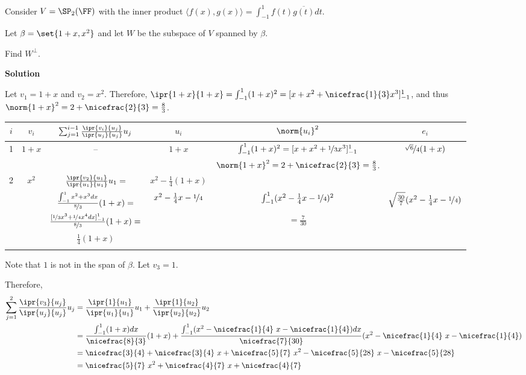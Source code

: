 \documentclass[11pt]{scrartcl}
\author{Alexander Illarionov}
\date{\today}
\title{}
\begin{document}
Consider \(V = \SP_2(\FF)\) with the inner product \(\langle f(x),g(x)\rangle = \int_{-1}^1 f(t)\overline{g(t)} dt\).

Let \(\beta = \set{1+x, x^2}\) and let \(W\) be the subspace of \(V\) spanned by \(\beta\).

\begin{problem*}
Find $W^{\bot}$.
\end{problem*}

\textbf{Solution}

Let \(v_1  = 1 + x\) and \(v_2 = x^2\). 
Therefore, \(\ipr{1+x}{1+x} = \int_{-1}^1 (1+x)^2 = [x+x^2+\nicefrac{1}{3}x^3]_{-1}^1\), 
and thus \(\norm{1+x}^2 = 2 + \nicefrac{2}{3} = \frac{8}{3}\).

\begin{adjustbox}{center}
\begin{tabulary}{1.25\textwidth}{|C|C|C|C|C|C|}
\hline
\(i\) & \(v_i\) & \(\sum_{j=1}^{i-1} \frac{ \ipr{v_i}{u_j}}{\ipr{u_j}{u_j}}u_j\) & \(u_i\) & \(\norm{u_i}^2\) & \(e_i\)\\
 & \(1 + x\) & -- & \(1+x\) & \(\int_{-1}^1(1+x)^2 = [x+x^2+\nicefrac{1}{3}x^3]_{-1}^1\) & \(\nicefrac{\sqrt{6}}{4}(1+x)\)\\
 &  &  &  & \(\norm{1+x}^2 = 2 + \nicefrac{2}{3} = \frac{8}{3}\). & \\
 & \(x^2\) & \(\frac{\ipr{v_2}{u_1}}{\ipr{u_1}{u_1}}u_1=\) & \(x^2-\frac{1}{4}(1+x)\) &  & \\
 &  & \(\frac{\int_{-1}^1 x^2 + x^3 dx}{\nicefrac{8}{3}}(1+x) =\) & \(x^2-\frac{1}{4}x - \nicefrac{1}{4}\) & \(\int_{-1}^1 (x^2-\frac{1}{4}x - \nicefrac{1}{4})^2\) & \(\sqrt{\frac{30}{7}}(x^2-\frac{1}{4}x - \nicefrac{1}{4})\)\\
 &  & \(\frac{[\nicefrac{1}{3}x^3 + \nicefrac{1}{4}x^4 dx]_{-1}^1}{\nicefrac{8}{3}}(1+x) =\) &  & \(=\frac{7}{30}\) & \\
 &  & \(\frac{1}{4}(1+x)\) &  &  & \\
 &  &  &  &  & \\
\hline
\end{tabulary}
\end{adjustbox}

Note that \(1\) is not in the span of \(\beta\). Let \(v_3=1\).

Therefore, 
\begin{align}
\sum_{j=1}^{2} \frac{ \ipr{v_3}{u_j}}{\ipr{u_j}{u_j}}u_j &= \frac{ \ipr{1}{u_1}}{\ipr{u_1}{u_1}}u_1 + \frac{ \ipr{1}{u_2}}{\ipr{u_2}{u_2}}u_2\\
&= \frac{\int_{-1}^1 (1+x) dx}{\nicefrac{8}{3}}(1+x) + \frac{\int_{-1}^1 (x^2-\nicefrac{1}{4}\ x -\nicefrac{1}{4}) dx}{\nicefrac{7}{30}}(x^2-\nicefrac{1}{4}\ x - \nicefrac{1}{4})\\
&=\nicefrac{3}{4} + \nicefrac{3}{4}\ x + \nicefrac{5}{7}\ x^2 - \nicefrac{5}{28}\ x - \nicefrac{5}{28}\\
&= \nicefrac{5}{7}\ x^2 + \nicefrac{4}{7}\ x + \nicefrac{4}{7}
\end{align}
\end{document}
